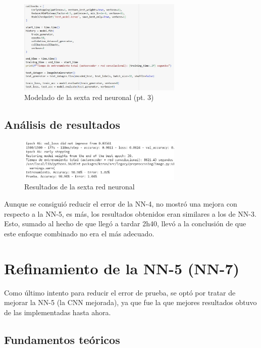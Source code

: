 \begin{enumerate}
	\begin{figure}[H]
		\centering
		\includegraphics[width=0.7\textwidth]{imgs/model-3-red6.JPG}
		\caption{Modelado de la sexta red neuronal (pt. 3)}
		\label{fig:model-3-red6}
	\end{figure}
\end{enumerate}


\subsection{Análisis de resultados}

\begin{figure}[H]
	\centering
	\includegraphics[width=0.7\textwidth]{imgs/results-red6.JPG}
	\caption{Resultados de la sexta red neuronal}
	\label{fig:results-red6}
\end{figure}

Aunque se consiguió reducir el error de la NN-4, no mostró una mejora con respecto a la NN-5, es más, los resultados obtenidos eran similares a los de NN-3. Esto, sumado al hecho de que llegó a tardar 2h40, llevó a la conclusión de que este enfoque combinado no era el más adecuado.

\newpage
\section{Refinamiento de la NN-5 (NN-7)}

Como último intento para reducir el error de prueba, se optó por tratar de mejorar la NN-5 (la CNN mejorada), ya que fue la que mejores resultados obtuvo de las implementadas hasta ahora.

\subsection{Fundamentos teóricos}

